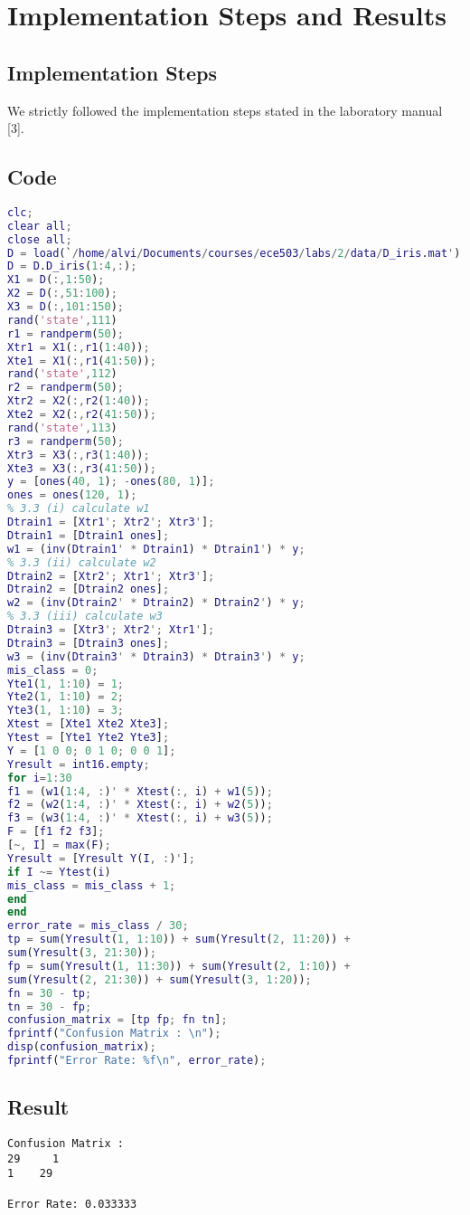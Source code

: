 \section{Implementation Steps and Results}
\label{sect:implementation-result}

\subsection{Implementation Steps}
\label{subsect:implementation_steps}
We strictly followed the implementation steps stated in the laboratory manual [3].

\subsection{Code}
\label{subsect:code}

\begin{lstlisting}[language=Matlab]
clc;
clear all;
close all;
D = load(`/home/alvi/Documents/courses/ece503/labs/2/data/D_iris.mat');
D = D.D_iris(1:4,:);
X1 = D(:,1:50);
X2 = D(:,51:100);
X3 = D(:,101:150);
rand('state',111)
r1 = randperm(50);
Xtr1 = X1(:,r1(1:40));
Xte1 = X1(:,r1(41:50));
rand('state',112)
r2 = randperm(50);
Xtr2 = X2(:,r2(1:40));
Xte2 = X2(:,r2(41:50));
rand('state',113)
r3 = randperm(50);
Xtr3 = X3(:,r3(1:40));
Xte3 = X3(:,r3(41:50));
y = [ones(40, 1); -ones(80, 1)];
ones = ones(120, 1);
% 3.3 (i) calculate w1
Dtrain1 = [Xtr1'; Xtr2'; Xtr3'];
Dtrain1 = [Dtrain1 ones];
w1 = (inv(Dtrain1' * Dtrain1) * Dtrain1') * y;
% 3.3 (ii) calculate w2
Dtrain2 = [Xtr2'; Xtr1'; Xtr3'];
Dtrain2 = [Dtrain2 ones];
w2 = (inv(Dtrain2' * Dtrain2) * Dtrain2') * y;
% 3.3 (iii) calculate w3
Dtrain3 = [Xtr3'; Xtr2'; Xtr1'];
Dtrain3 = [Dtrain3 ones];
w3 = (inv(Dtrain3' * Dtrain3) * Dtrain3') * y;
mis_class = 0;
Yte1(1, 1:10) = 1;
Yte2(1, 1:10) = 2;
Yte3(1, 1:10) = 3;
Xtest = [Xte1 Xte2 Xte3];
Ytest = [Yte1 Yte2 Yte3];
Y = [1 0 0; 0 1 0; 0 0 1];
Yresult = int16.empty;
for i=1:30
f1 = (w1(1:4, :)' * Xtest(:, i) + w1(5));
f2 = (w2(1:4, :)' * Xtest(:, i) + w2(5));
f3 = (w3(1:4, :)' * Xtest(:, i) + w3(5));
F = [f1 f2 f3];
[~, I] = max(F);
Yresult = [Yresult Y(I, :)'];
if I ~= Ytest(i)
mis_class = mis_class + 1;
end
end
error_rate = mis_class / 30;
tp = sum(Yresult(1, 1:10)) + sum(Yresult(2, 11:20)) + 
sum(Yresult(3, 21:30));
fp = sum(Yresult(1, 11:30)) + sum(Yresult(2, 1:10)) + 
sum(Yresult(2, 21:30)) + sum(Yresult(3, 1:20));
fn = 30 - tp;
tn = 30 - fp;
confusion_matrix = [tp fp; fn tn];
fprintf("Confusion Matrix : \n");
disp(confusion_matrix);
fprintf("Error Rate: %f\n", error_rate);
\end{lstlisting}

\subsection{Result}
\label{subsect:result}
\begin{verbatim}
Confusion Matrix : 
29     1
1    29

Error Rate: 0.033333
\end{verbatim}